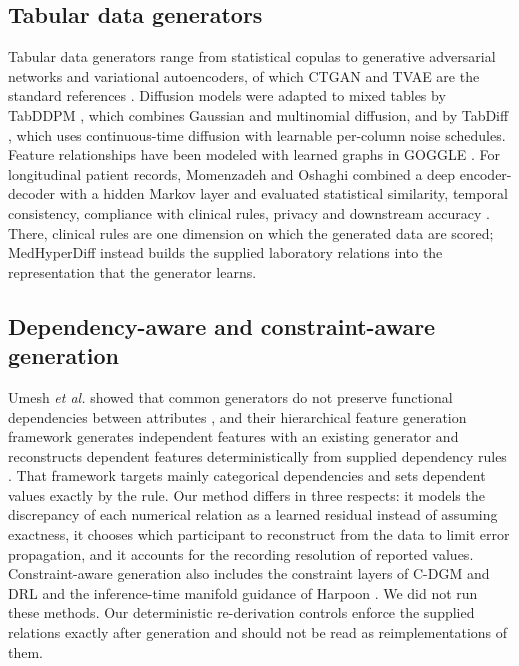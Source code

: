 \documentclass[pdflatex,referee]{sn-jnl}%
\begin{document}
\subsection*{Tabular data generators}

Tabular data generators range from statistical copulas to generative adversarial networks and variational autoencoders, of which CTGAN and TVAE are the standard references \cite{xu2019ctgan}. Diffusion models \cite{ho2020ddpm,austin2021d3pm} were adapted to mixed tables by TabDDPM \cite{kotelnikov2023tabddpm}, which combines Gaussian and multinomial diffusion, and by TabDiff \cite{shi2025tabdiff}, which uses continuous-time diffusion with learnable per-column noise schedules. Feature relationships have been modeled with learned graphs in GOGGLE \cite{liu2023goggle}. For longitudinal patient records, Momenzadeh and Oshaghi combined a deep encoder-decoder with a hidden Markov layer and evaluated statistical similarity, temporal consistency, compliance with clinical rules, privacy and downstream accuracy \cite{momenzadeh2026dghmm}. There, clinical rules are one dimension on which the generated data are scored; MedHyperDiff instead builds the supplied laboratory relations into the representation that the generator learns.

\subsection*{Dependency-aware and constraint-aware generation}

Umesh \textit{et al.} showed that common generators do not preserve functional dependencies between attributes \cite{umesh2024dependencies}, and their hierarchical feature generation framework generates independent features with an existing generator and reconstructs dependent features deterministically from supplied dependency rules \cite{umesh2025hfgf}. That framework targets mainly categorical dependencies and sets dependent values exactly by the rule. Our method differs in three respects: it models the discrepancy of each numerical relation as a learned residual instead of assuming exactness, it chooses which participant to reconstruct from the data to limit error propagation, and it accounts for the recording resolution of reported values. Constraint-aware generation also includes the constraint layers of C-DGM \cite{stoian2024cdgm} and DRL \cite{stoian2025drl} and the inference-time manifold guidance of Harpoon \cite{shankar2026harpoon}. We did not run these methods. Our deterministic re-derivation controls enforce the supplied relations exactly after generation and should not be read as reimplementations of them.
\end{document}
